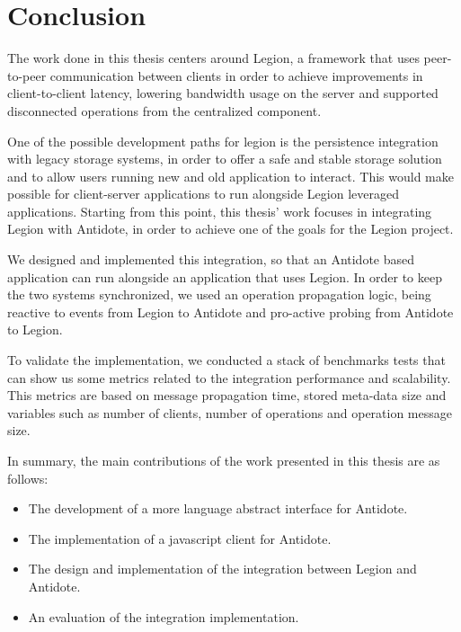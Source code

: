 \chapter{Conclusion}
\label{cha:conclusion}
The work done in this thesis centers around Legion, a framework that uses peer-to-peer communication between clients in order to achieve improvements in client-to-client latency, lowering bandwidth usage on the server and supported disconnected operations from the centralized component.\par
	One of the possible development paths for legion is the persistence integration with legacy storage systems, in order to offer a safe and stable storage solution and to allow users running new and old application to interact. This would make possible for client-server applications to run alongside Legion leveraged applications. Starting from this point, this thesis' work focuses in integrating Legion with Antidote, in order to achieve one of the goals for the Legion project.\par
	We designed and implemented this integration, so that an Antidote based application can run alongside an application that uses Legion. In order to keep the two systems synchronized, we used an operation propagation logic, being reactive to events from Legion to Antidote and pro-active probing from Antidote to Legion.\par
	To validate the implementation, we conducted a stack of benchmarks tests that can show us some metrics related to the integration performance and scalability. This metrics are based on message propagation time, stored meta-data size and variables such as number of clients, number of operations and operation message size.\par
In summary, the main contributions of the work presented in this thesis are as follows:

\begin{itemize}
\item The development of a more language abstract interface for Antidote.
\item The implementation of a javascript client for Antidote.
\item The design and implementation of the integration between Legion and Antidote.
\item An evaluation of the integration implementation.
\end{itemize}

